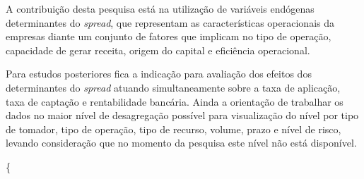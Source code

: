 \documentclass[
  12pt,
  12pt,
  openright,
  oneside,
  a4paper,
  chapter=TITLE,
  section=TITLE,
  subsection=TITLE,
  subsubsection=TITLE,
  english,
  portugues,
  sumario=tradicional]{abntex2}
\begin{document}
A contribuição desta pesquisa está na utilização de variáveis endógenas determinantes do \emph{spread}, que representam as características operacionais da empresas diante um conjunto de fatores que implicam no tipo de operação, capacidade de gerar receita, origem do capital e eficiência operacional.

Para estudos posteriores fica a indicação para avaliação dos efeitos dos determinantes do \emph{spread} atuando simultaneamente sobre a taxa de aplicação, taxa de captação e rentabilidade bancária. Ainda a orientação de trabalhar os dados no maior nível de desagregação possível para visualização do nível por tipo de tomador, tipo de operação, tipo de recurso, volume, prazo e nível de risco, levando consideração que no momento da pesquisa este nível não está disponível.

\postextual

\printbibliography[title={REFERÊNCIAS}]

\postextual



\{
\end{document}
